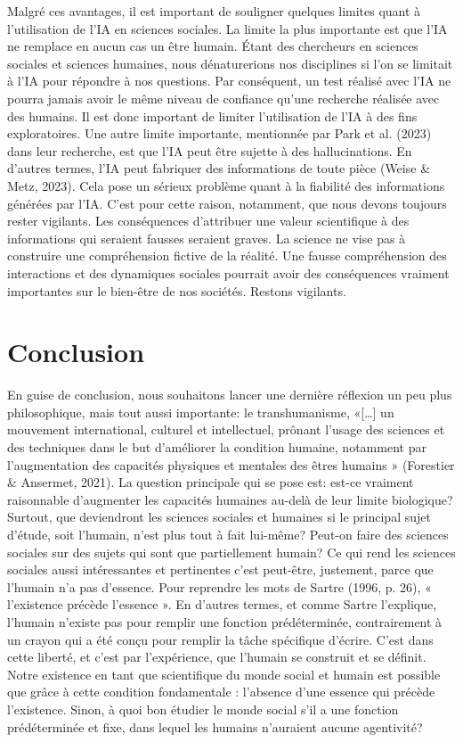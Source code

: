 \documentclass[
  letterpaper,
  DIV=11,
  numbers=noendperiod]{scrreprt}
\begin{document}
Malgré ces avantages, il est important de souligner quelques limites
quant à l'utilisation de l'IA en sciences sociales. La limite la plus
importante est que l'IA ne remplace en aucun cas un être humain. Étant
des chercheurs en sciences sociales et sciences humaines, nous
dénaturerions nos disciplines si l'on se limitait à l'IA pour répondre à
nos questions. Par conséquent, un test réalisé avec l'IA ne pourra
jamais avoir le même niveau de confiance qu'une recherche réalisée avec
des humains. Il est donc important de limiter l'utilisation de l'IA à
des fins exploratoires. Une autre limite importante, mentionnée par Park
et al. (2023) dans leur recherche, est que l'IA peut être sujette à des
hallucinations. En d'autres termes, l'IA peut fabriquer des informations
de toute pièce (Weise \& Metz, 2023). Cela pose un sérieux problème
quant à la fiabilité des informations générées par l'IA. C'est pour
cette raison, notamment, que nous devons toujours rester vigilants. Les
conséquences d'attribuer une valeur scientifique à des informations qui
seraient fausses seraient graves. La science ne vise pas à construire
une compréhension fictive de la réalité. Une fausse compréhension des
interactions et des dynamiques sociales pourrait avoir des conséquences
vraiment importantes sur le bien-être de nos sociétés. Restons
vigilants.

\section{Conclusion}\label{conclusion-2}

En guise de conclusion, nous souhaitons lancer une dernière réflexion un
peu plus philosophique, mais tout aussi importante: le transhumanisme,
«{[}\ldots{]} un mouvement international, culturel et intellectuel,
prônant l'usage des sciences et des techniques dans le but d'améliorer
la condition humaine, notamment par l'augmentation des capacités
physiques et mentales des êtres humains » (Forestier \& Ansermet, 2021).
La question principale qui se pose est: est-ce vraiment raisonnable
d'augmenter les capacités humaines au-delà de leur limite biologique?
Surtout, que deviendront les sciences sociales et humaines si le
principal sujet d'étude, soit l'humain, n'est plus tout à fait lui-même?
Peut-on faire des sciences sociales sur des sujets qui sont que
partiellement humain? Ce qui rend les sciences sociales aussi
intéressantes et pertinentes c'est peut-être, justement, parce que
l'humain n'a pas d'essence. Pour reprendre les mots de Sartre (1996, p.
26), « l'existence précède l'essence ». En d'autres termes, et comme
Sartre l'explique, l'humain n'existe pas pour remplir une fonction
prédéterminée, contrairement à un crayon qui a été conçu pour remplir la
tâche spécifique d'écrire. C'est dans cette liberté, et c'est par
l'expérience, que l'humain se construit et se définit. Notre existence
en tant que scientifique du monde social et humain est possible que
grâce à cette condition fondamentale : l'absence d'une essence qui
précède l'existence. Sinon, à quoi bon étudier le monde social s'il a
une fonction prédéterminée et fixe, dans lequel les humains n'auraient
aucune agentivité?
\end{document}
